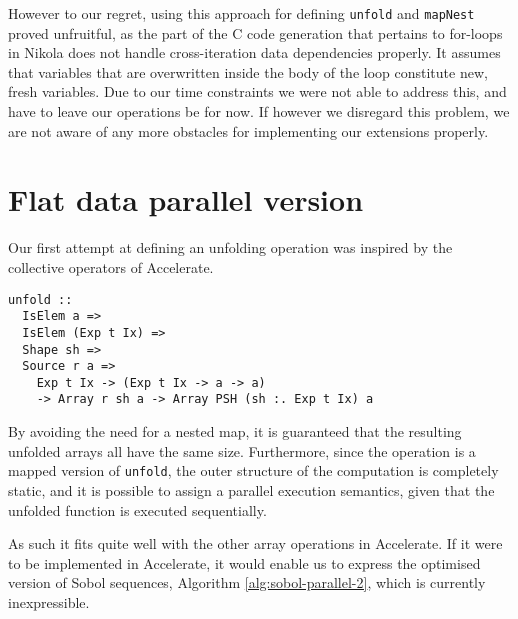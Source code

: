 
However to our regret, using this approach for defining \texttt{unfold} and
\texttt{mapNest} proved unfruitful, as the part of the C code generation that
pertains to for-loops in Nikola does not handle cross-iteration data
dependencies properly. It assumes that variables that are overwritten inside
the body of the loop constitute new, fresh variables. Due to our time
constraints we were not able to address this, and have to leave our operations
be for now. If however we disregard this problem, we are not aware of any more
obstacles for implementing our extensions properly.

\section{Flat data parallel version}

Our first attempt at defining an unfolding operation was inspired by the
collective operators of Accelerate.

\begin{verbatim}
unfold ::
  IsElem a =>
  IsElem (Exp t Ix) =>
  Shape sh =>
  Source r a =>
    Exp t Ix -> (Exp t Ix -> a -> a)
    -> Array r sh a -> Array PSH (sh :. Exp t Ix) a
\end{verbatim}

By avoiding the need for a nested map, it is guaranteed that the resulting
unfolded arrays all have the same size. Furthermore, since the operation is a
mapped version of \texttt{unfold}, the outer structure of the computation is
completely static, and it is possible to assign a parallel execution semantics,
given that the unfolded function is executed sequentially.

As such it fits quite well with the other array operations in Accelerate. If it
were to be implemented in Accelerate, it would enable us to express the
optimised version of Sobol sequences, Algorithm \ref{alg:sobol-parallel-2},
which is currently inexpressible.
